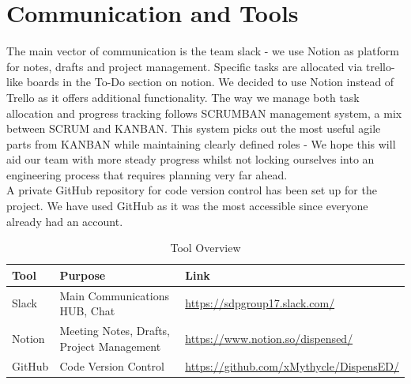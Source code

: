 \documentclass[a4paper,10pt,DIV10,openright,openbib]{scrreprt}
\let\oldbibliography%
\renewcommand{}[1]{{%
  \let\chapter\section%
  \oldbibliography{#1}}}%
\begin{document}
\section{Communication and Tools}
The main vector of communication is the team slack - we use Notion as platform for notes,
drafts and project management. Specific tasks are allocated via trello-like boards in
the To-Do section on notion. We decided to use Notion instead of Trello as it
offers additional functionality. The way we manage both task allocation and
progress tracking follows SCRUMBAN management system, a mix between SCRUM
and KANBAN. This system picks out the most useful agile parts from KANBAN while
maintaining clearly defined roles - We hope this will aid our team with more
steady progress whilst not locking ourselves into an engineering process that
requires planning very far ahead. \\
A private GitHub repository for code version control has been set
up for the project. We have used GitHub as it was the most accessible since
everyone already had an account.\\
\begin{table}[h]
\centering
\caption{Tool Overview}
\begin{tabular}{@{}lll@{}}
\toprule
Tool   & Purpose                                   & Link     \\ \midrule
Slack  & Main Communications HUB, Chat             & \url{https://sdpgroup17.slack.com/} \\
Notion & Meeting Notes, Drafts, Project Management & \url{https://www.notion.so/dispensed/} \\
GitHub & Code Version Control                      & \url{https://github.com/xMythycle/DispensED/} \\ \bottomrule
\end{tabular}
\end{table}


%



   
\end{document}
